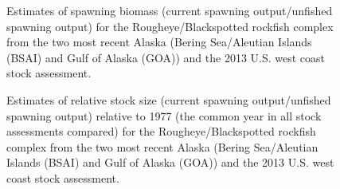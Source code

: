 \documentclass[
]{scrartcl}
\begin{document}
\begin{figure}


\caption{\label{fig-SO_comp}Estimates of spawning biomass (current
spawning output/unfished spawning output) for the Rougheye/Blackspotted
rockfish complex from the two most recent Alaska (Bering Sea/Aleutian
Islands (BSAI) and Gulf of Alaska (GOA)) and the 2013 U.S. west coast
stock assessment.}

\end{figure}%

\begin{figure}


\caption{\label{fig-RSS_comp}Estimates of relative stock size (current
spawning output/unfished spawning output) relative to 1977 (the common
year in all stock assessments compared) for the Rougheye/Blackspotted
rockfish complex from the two most recent Alaska (Bering Sea/Aleutian
Islands (BSAI) and Gulf of Alaska (GOA)) and the 2013 U.S. west coast
stock assessment.}

\end{figure}%
\end{document}
